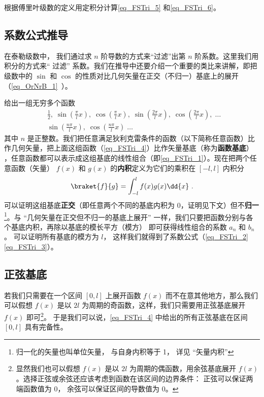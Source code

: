 \begin{exercise}{}
根据傅里叶级数的定义用定积分计算\autoref{eq_FSTri_5} 和\autoref{eq_FSTri_6}。
\end{exercise}

\subsection{系数公式推导}

在泰勒级数中，%
我们通过求 $n$ 阶导数的方式来“过滤”出第 $n$ 阶系数。这里我们用积分的方式来“ 过滤” 系数。我们在推导中还要介绍一个重要的类比来讲解，即把级数中的 $\sin$ 和 $\cos$ 的性质对比几何矢量在正交（不归一）基底上的展开（\autoref{eq_OrNrB_1}~）。

% 

给出一组无穷多个函数
\begin{equation}\label{eq_FSTri_4}
\begin{aligned}
&\frac12,\;   \sin(\frac{\pi}{l} x),\;   \cos(\frac{\pi}{l} x),\;   \sin(\frac{2\pi}{l} x),\;   \cos(\frac{2\pi}{l} x),\;   \dots\\
&\sin(\frac{n\pi}{l} x),\;   \cos(\frac{n\pi}{l} x)\;   \dots
\end{aligned}~\end{equation}
其中 $n$ 是正整数。我们把任意满足狄利克雷条件的函数（以下简称任意函数）比作几何矢量，把上面这组函数（\autoref{eq_FSTri_4}）比作矢量基底（称为\textbf{函数基底}）
，任意函数都可以表示成这组基底的线性组合（即\autoref{eq_FSTri_1}）。现在把两个任意函数（矢量） $f(x)$ 和 $g(x)$ 的\textbf{内积}定义为它们的乘积在 $[-l,l]$ 内积分
\begin{equation}
\braket{f}{g} = \int_{-l}^{l} f(x) g(x) \dd{x}~.
\end{equation}
可以证明这组基底\textbf{正交}（即任意两个不同的基底内积为 0，证明见下文）但不\textbf{归一}\footnote{归一化的矢量也叫单位矢量， 与自身内积等于 1， 详见 “矢量内积”}。与 “几何矢量在正交但不归一的基底上展开” 一样，我们只要把函数分别与各个基底内积，再除以基底的模长平方（模方）
即可获得线性组合的系数 $a_n$ 和 $b_n$。 可以证明所有基底的模方为 $l$， 这样我们就得到了系数公式（\autoref{eq_FSTri_2} \autoref{eq_FSTri_3}）。


\subsection{正弦基底}\label{sub_FSTri_3}
若我们只需要在一个区间 $[0,l]$ 上展开函数 $f(x)$ 而不在意其他地方，那么我们可以假想 $f(x)$ 是以 $2l$ 为周期的奇函数，这样，我们只需要用正弦基底展开 $f(x)$ 即可\footnote{显然我们也可以假想 $f(x)$ 是以 $2l$ 为周期的偶函数，用余弦基底展开 $f(x)$。选择正弦或余弦还应该考虑到函数在该区间的边界条件： 正弦可以保证两端函数值为 0， 余弦可以保证区间的导数值为 0。}。 于是我们可以说，\autoref{eq_FSTri_4} 中给出的所有正弦基底在区间 $[0,l]$ 具有完备性。

